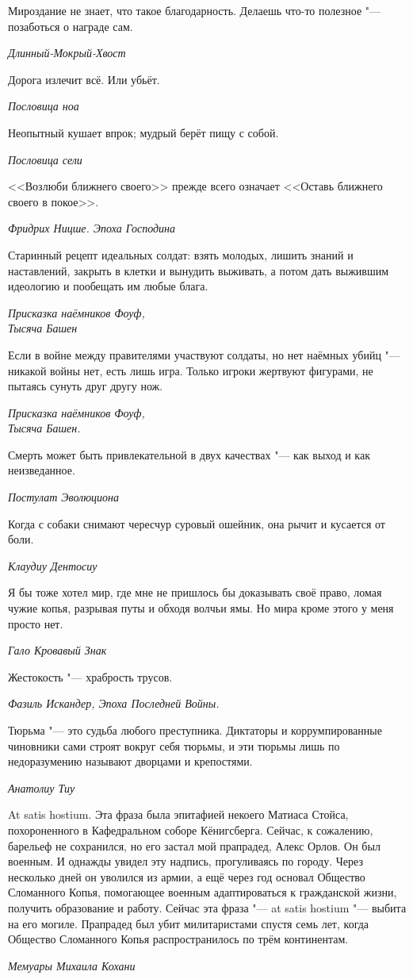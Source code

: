 \documentclass[a4paper,10pt]{book}
\begin{document}
\epigraph{Мироздание не знает, что такое благодарность. 
Делаешь что-то полезное "--- позаботься о награде сам.}
{\textit{Длинный-Мокрый-Хвост}}

\epigraph{Дорога излечит всё. Или убьёт.}
{\textit{Пословица ноа}}

\epigraph{Неопытный кушает впрок; мудрый берёт пищу с собой.}
{\textit{Пословица сели}}

\epigraph{<<Возлюби ближнего своего>> прежде всего означает <<Оставь ближнего 
своего в покое>>.}
{\textit{Фридрих Ницше. Эпоха Господина}}

\epigraph{Старинный рецепт идеальных солдат: взять молодых, 
лишить знаний и наставлений, закрыть в клетки и вынудить выживать, 
а потом дать выжившим идеологию и пообещать им любые блага.}
{\textit{Присказка наёмников Фоуф,\\Тысяча Башен}}

\epigraph{Если в войне между правителями участвуют солдаты, но нет наёмных 
убийц 
"--- никакой войны нет, есть лишь игра. Только игроки жертвуют фигурами, не 
пытаясь сунуть друг другу нож.}
{\textit{Присказка наёмников Фоуф,\\Тысяча Башен.}}


 \epigraph{Смерть может быть привлекательной в двух качествах "--- как выход и 
как неизведанное.}
{\textit{Постулат Эволюциона}}

\epigraph{Когда с собаки снимают чересчур суровый ошейник, она рычит и кусается 
от боли.}
{\textit{Клаудиу Дентосиу}}

\epigraph{Я бы тоже хотел мир, где мне не пришлось бы доказывать своё право,
ломая чужие копья, разрывая путы и обходя волчьи ямы. Но мира кроме этого у 
меня 
просто нет.}
{\textit{Гало Кровавый Знак}}

\epigraph{Жестокость "--- храбрость трусов.}
{\textit{Фазиль Искандер, Эпоха Последней Войны.}}

\epigraph{Тюрьма "--- это судьба любого преступника. 
Диктаторы и коррумпированные чиновники сами строят вокруг себя тюрьмы, 
и эти тюрьмы лишь по недоразумению называют дворцами и крепостями.}
{\textit{Анатолиу Тиу}}

\epigraph{At satis hostium. Эта фраза была эпитафией некоего Матиаса Стойса, 
похороненного в Кафедральном соборе Кёнигсберга.
Сейчас, к сожалению, барельеф не сохранился, но его застал мой прапрадед, Алекс 
Орлов. Он был военным. И однажды
увидел эту надпись, прогуливаясь по городу. Через несколько дней он уволился из 
армии, а ещё через год основал Общество
Сломанного Копья, помогающее военным адаптироваться к гражданской жизни, 
получить образование и работу. Сейчас эта фраза "--- at satis hostium "--- 
выбита на его могиле.
Прапрадед был убит милитаристами спустя семь лет, когда Общество Сломанного 
Копья распространилось по трём континентам.}
{\textit{Мемуары Михаила Кохани}}
\end{document}
